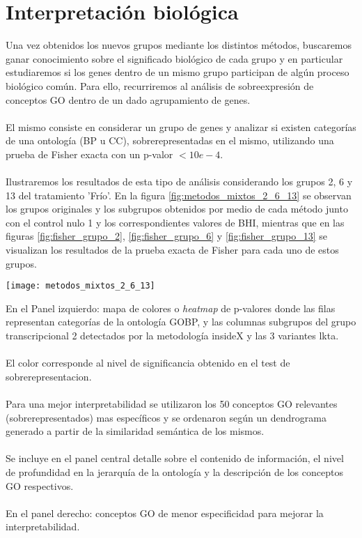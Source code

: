 \section{Interpretación biológica}
Una vez obtenidos los nuevos grupos mediante los distintos métodos, buscaremos ganar conocimiento sobre el significado biológico de cada grupo y en particular estudiaremos si los genes dentro de un mismo grupo participan de algún proceso biológico común. Para ello, recurriremos al análisis de sobreexpresión de conceptos GO dentro de un dado agrupamiento de genes.\\\\
El mismo consiste en considerar un grupo de genes y analizar si existen categorías de una ontología (BP u CC), sobrerepresentadas en el mismo, utilizando una prueba de Fisher exacta con un p-valor $<10e-4$.\\\\
Ilustraremos los resultados de esta tipo de análisis considerando los grupos 2, 6 y 13 del tratamiento 'Frío'. En la figura \ref{fig:metodos_mixtos_2_6_13} se observan los grupos originales y los subgrupos obtenidos por medio de cada método junto con el control nulo 1 y los correspondientes valores de BHI, mientras que en las figuras \ref{fig:fisher_grupo_2}, \ref{fig:fisher_grupo_6} y \ref{fig:fisher_grupo_13} se visualizan los resultados de la prueba exacta de Fisher para cada uno de estos grupos.
\clearpage
\begin{center}
\texttt{[image: metodos\_mixtos\_2\_6\_13]}
\label{fig:metodos_mixtos_2_6_13}
\end{center}
En el Panel izquierdo: mapa de colores o \textit{heatmap} de p-valores donde las filas representan categorías de la ontología GOBP, y las columnas subgrupos del grupo transcripcional 2 detectados por la metodología insideX y las 3 variantes lkta.\\\\
El color corresponde al nivel de significancia obtenido en el test de sobrerepresentacion.\\\\ 
Para una mejor interpretabilidad se utilizaron los 50 conceptos GO relevantes (sobrerepresentados) mas específicos y se ordenaron según un dendrograma generado a partir de la similaridad semántica de los mismos.\\\\
Se incluye en el panel central detalle sobre el contenido de información, el nivel de profundidad en la jerarquía de la ontología y la descripción de los conceptos GO respectivos.\\\\
En el panel derecho: conceptos GO de menor especificidad para mejorar la interpretabilidad.

